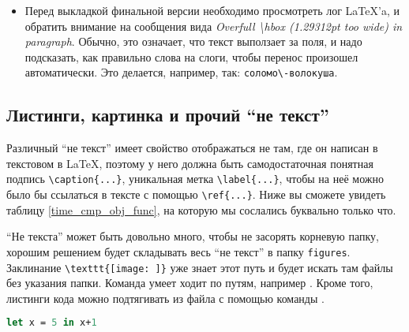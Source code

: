 \begin{itemize}
  \item Перед выкладкой финальной версии необходимо просмотреть лог \LaTeX'a, и обратить внимание на сообщения вида \emph{Overfull \textbackslash hbox (1.29312pt too wide) in paragraph}. Обычно, это означает, что текст выползает за поля, и надо подсказать, как правильно слова на слоги, чтобы перенос произошел автоматически. Это делается, например, так: \verb=соломо\-волокуша=.
\end{itemize}



\subsection{Листинги, картинка и прочий \enquote{не текст}}

Различный \enquote{не текст} имеет свойство отображаться не там, где он написан в текстовом в \LaTeX{}, поэтому у него должна быть самодостаточ\-ная понятная подпись \verb=\caption{...}=, уникальная метка \verb=\label{...}=, чтобы на неё можно было бы ссылаться в тексте с помощью \verb=\ref{...}=. Ниже вы сможете увидеть таблицу \ref{time_cmp_obj_func}, на которую мы сослались буквально только что.

\enquote{Не текста} может быть довольно много, чтобы не засорять корневую папку, хорошим решением будет складывать весь \enquote{не текст} в папку \texttt{figures}.
Заклинание \verb=\texttt{[image: ]}= уже знает этот путь и будет искать там файлы без указания папки.
Команда \verb== умеет ходит по путям, например \verb==.
Кроме того, листинги кода можно подтягивать из файла с помощью команды \verb==.

\begin{lstlisting}[caption={Название для листинга кода. Достаточно длинное, чтобы люди, которые смотрят картинку сразу после названия статьи (т.~е. все люди), смогли разобраться и понять к чему в статье листинги, картинки и прочий \enquote{не текст}.}, language=Caml, frame=single]
  let x = 5 in x+1
\end{lstlisting}



